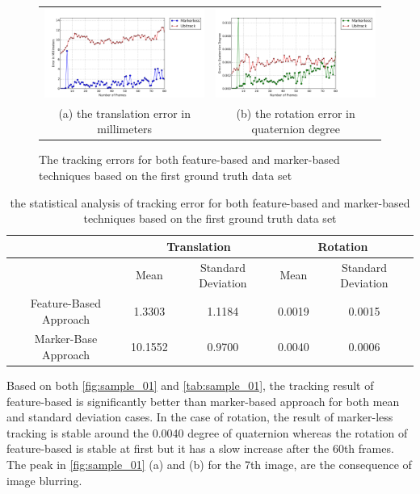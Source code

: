 \begin{figure}[H]
\begin{tabular}{cc}
  \includegraphics[width=80mm]{figures/global_35/graph_translation} &  \includegraphics[width=80mm]{figures/global_35/graph_rotation} \\
(a) the translation error in millimeters & (b) the rotation error in quaternion degree \\[6pt]
\end{tabular}
\caption{The tracking errors for both feature-based and marker-based techniques based on the first ground truth data set}   \label{fig:sample_01}
\end{figure}

\begin{table}[H]
\centering
  \begin{tabular}{| c || c | c | c | c |}
      \hline
      & \multicolumn{2}{c|}{Translation} & \multicolumn{2}{c|}{Rotation} \\ \hline
       & Mean & Standard Deviation & Mean & Standard Deviation \\ \hline
      Feature-Based Approach & 1.3303 & 1.1184 & 0.0019 & 0.0015 \\ \hline
      Marker-Base Approach & 10.1552 & 0.9700 & 0.0040 & 0.0006 \\ \hline
  \end{tabular}
  \caption{the statistical analysis of tracking error for both feature-based and marker-based techniques based on the first ground truth data set} \label{tab:sample_01}
\end{table}

Based on both \autoref{fig:sample_01} and \autoref{tab:sample_01}, the tracking result of feature-based is significantly better than marker-based approach for both mean and standard deviation cases. In the case of rotation, the result of marker-less tracking is stable around the 0.0040 degree of quaternion whereas the rotation of feature-based is stable at first but it has a slow increase after the 60th frames. The peak in \autoref{fig:sample_01} (a) and (b) for the 7th image, are the consequence of image blurring. 

